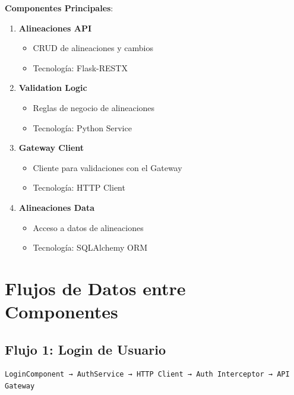\documentclass[
  spanish,
  11pt,
  letterpaper,
]{book}
\providecommand{\tightlist}{%
  \setlength{\itemsep}{0pt}\setlength{\parskip}{0pt}}
\begin{document}
\textbf{Componentes Principales}:

\begin{enumerate}
\def\labelenumi{\arabic{enumi}.}
\tightlist
\item
  \textbf{Alineaciones API}

  \begin{itemize}
  \tightlist
  \item
    CRUD de alineaciones y cambios
  \item
    Tecnología: Flask-RESTX
  \end{itemize}
\item
  \textbf{Validation Logic}

  \begin{itemize}
  \tightlist
  \item
    Reglas de negocio de alineaciones
  \item
    Tecnología: Python Service
  \end{itemize}
\item
  \textbf{Gateway Client}

  \begin{itemize}
  \tightlist
  \item
    Cliente para validaciones con el Gateway
  \item
    Tecnología: HTTP Client
  \end{itemize}
\item
  \textbf{Alineaciones Data}

  \begin{itemize}
  \tightlist
  \item
    Acceso a datos de alineaciones
  \item
    Tecnología: SQLAlchemy ORM
  \end{itemize}
\end{enumerate}

\section{Flujos de Datos entre
Componentes}\label{flujos-de-datos-entre-componentes}

\subsection{Flujo 1: Login de Usuario}\label{flujo-1-login-de-usuario}

\begin{verbatim}
LoginComponent → AuthService → HTTP Client → Auth Interceptor → API Gateway
\end{verbatim}
\end{document}
